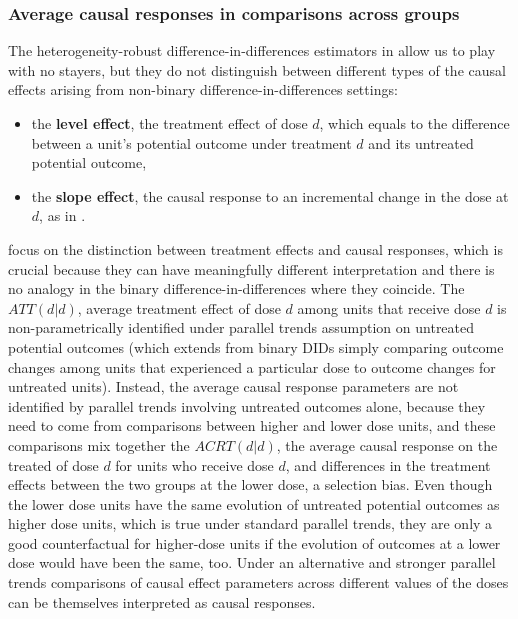 \documentclass[11pt]{article}
\begin{document}
\subsubsection{Average causal responses in comparisons across groups}

The heterogeneity-robust difference-in-differences estimators in \citet{bib:dechaisemartin2022b} allow us to play with no stayers, but they do not distinguish between different types of the causal effects arising from non-binary difference-in-differences settings:
\begin{itemize}
    \item the \textbf{level effect}, the treatment effect of dose $d$, which equals to the difference between a unit's potential outcome under treatment $d$ and its untreated potential outcome,
    \item the \textbf{slope effect}, the causal response to an incremental change in the dose at $d$, as in \citet{bib:angrist1995}.
\end{itemize}
\citet{bib:callaway2021} focus on the distinction between treatment effects and causal responses, which is crucial because they can have meaningfully different interpretation and there is no analogy in the binary difference-in-differences where they coincide. The $ATT(d|d)$, average treatment effect of dose $d$ among units that receive dose $d$ is non-parametrically identified under parallel trends assumption on untreated potential outcomes (which extends from binary DIDs simply comparing outcome changes among units that experienced a particular dose to outcome changes for untreated units). Instead, the average causal response parameters are not identified by parallel trends involving untreated outcomes alone, because they need to come from comparisons between higher and lower dose units, and these comparisons mix together the $ACRT(d|d)$, the average causal response on the treated of dose $d$ for units who receive dose $d$, and differences in the treatment effects between the two groups at the lower dose, a selection bias. Even though the lower dose units have the same evolution of untreated potential outcomes as higher dose units, which is true under standard parallel trends, they are only a good counterfactual for higher-dose units if the evolution of outcomes at a lower dose would have been the same, too. Under an alternative and stronger parallel trends comparisons of causal effect parameters across different values of the doses can be themselves interpreted as causal responses.
\end{document}
